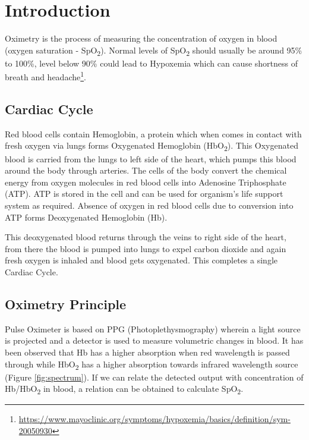 	
\section{Introduction}

	Oximetry is the process of measuring the concentration of oxygen in blood (oxygen saturation - SpO\textsubscript{2}). Normal levels of SpO\textsubscript{2} should usually be around 95\% to 100\%, level below 90\% could lead to Hypoxemia which can cause shortness of breath and headache\footnote{\url{https://www.mayoclinic.org/symptoms/hypoxemia/basics/definition/sym-20050930}}.

\subsection{Cardiac Cycle}

	Red blood cells contain Hemoglobin, a protein which when comes in contact with fresh oxygen via lungs forms Oxygenated Hemoglobin (HbO\textsubscript{2}). This Oxygenated blood is carried from the lungs to left side of the heart, which pumps this blood around the body through arteries. The cells of the body convert the chemical energy from oxygen molecules in red blood cells into Adenosine Triphosphate (ATP). ATP is stored in the cell and can be used for organism's life support system as required. Absence of oxygen in red blood cells due to conversion into ATP forms Deoxygenated Hemoglobin (Hb).\medskip

	This deoxygenated blood returns through the veins to right side of the heart, from there the blood is pumped into lungs to expel carbon dioxide and again fresh oxygen is inhaled and blood gets oxygenated. This completes a single Cardiac Cycle.

\subsection{Oximetry Principle}

	Pulse Oximeter is based on PPG (Photoplethysmography) wherein a light source is projected and a detector is used to measure volumetric changes in blood. It has been observed that Hb has a higher absorption when red wavelength is passed through while HbO\textsubscript{2} has a higher absorption towards infrared wavelength source (Figure \ref{fig:spectrum}). If we can relate the detected output with concentration of Hb/HbO\textsubscript{2} in blood, a relation can be obtained to calculate SpO\textsubscript{2}.

